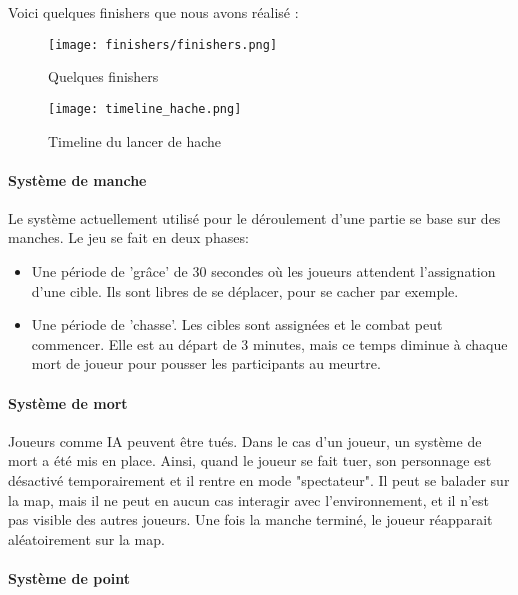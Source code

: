 			Voici quelques finishers que nous avons réalisé :

			\begin{figure}[hbt!]
				\centering
				\texttt{[image: finishers/finishers.png]}
				\caption{Quelques finishers}
			\end{figure}

			\FloatBarrier
			\begin{figure}[hbt!]
				\centering
				\texttt{[image: timeline\_hache.png]}
				\caption{Timeline du lancer de hache}
			\end{figure}
			\FloatBarrier


		\paragraph{Système de manche}

			Le système actuellement utilisé pour le déroulement d'une partie se base sur des manches. Le jeu se fait en deux phases:
			\begin{itemize}
				\item Une période de 'grâce' de 30 secondes où les joueurs attendent l'assignation d'une cible. Ils sont libres de se déplacer, pour se cacher par exemple.
				\item Une période de 'chasse'. Les cibles sont assignées et le combat peut commencer. Elle est au départ de 3 minutes, mais ce temps
				diminue à chaque mort de joueur pour pousser les participants au meurtre.
			\end{itemize}
		

		\paragraph{Système de mort}

			Joueurs comme IA peuvent être tués. Dans le cas d'un joueur, un système de mort a été mis en place. Ainsi,
			quand le joueur se fait tuer, son personnage est désactivé temporairement et il rentre
			en mode "spectateur". Il peut se balader sur la map, mais il ne peut en aucun cas interagir avec l'environnement,
			et il n'est pas visible des autres joueurs. Une fois la manche terminé, le joueur réapparait aléatoirement sur la map.


		\paragraph{Système de point}

